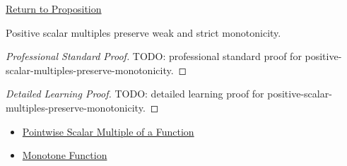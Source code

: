 \newpage
{}
\label{prf:positive-scalar-multiples-preserve-monotonicity}

\begin{remark*}[Return]
\hyperref[prop:positive-scalar-multiples-preserve-monotonicity]{Return to Proposition}
\end{remark*}

\begin{proposition*}
Positive scalar multiples preserve weak and strict monotonicity.
\end{proposition*}

\begin{proof}[Professional Standard Proof]
\LRAProofBodyStart
TODO: professional standard proof for positive-scalar-multiples-preserve-monotonicity.
\end{proof}

\begin{proof}[Detailed Learning Proof]
\LRAProofBodyStart
TODO: detailed learning proof for positive-scalar-multiples-preserve-monotonicity.
\end{proof}

\begin{remark*}
\end{remark*}

\begin{dependencies}
\begin{itemize}
  \item \hyperref[def:pointwise-scalar-multiple-of-a-function]{Pointwise Scalar Multiple of a Function}
  \item \hyperref[def:function-monotone]{Monotone Function}
\end{itemize}
\end{dependencies}

\clearpage
